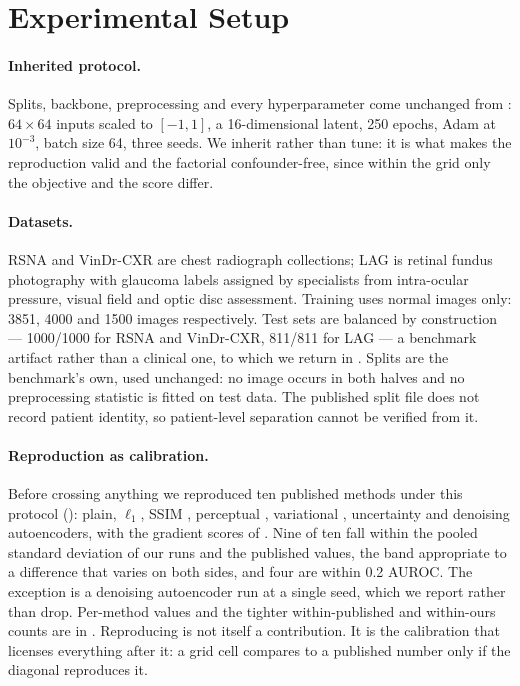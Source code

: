 \documentclass[pmlr,twocolumn,10pt]{jmlr} %
\begin{document}
\section{Experimental Setup}
\label{sec:setup}

\paragraph*{Inherited protocol.}
Splits, backbone, preprocessing and every hyperparameter come unchanged from
\citet{cai2025medianomaly}: $64\times64$ inputs scaled to $[-1,1]$, a 16-dimensional latent,
250 epochs, Adam at $10^{-3}$, batch size 64, three seeds. We inherit rather than tune: it is
what makes the reproduction valid and the factorial confounder-free, since within the grid
only the objective and the score differ.

\paragraph*{Datasets.}
RSNA \citep{shih2019rsna} and VinDr-CXR \citep{nguyen2022vindr} are chest radiograph
collections; LAG \citep{li2019lag} is retinal fundus photography with glaucoma labels
assigned by specialists from intra-ocular pressure, visual field and optic disc assessment.
Training uses normal images only: 3851, 4000 and 1500 images respectively. Test sets are
balanced by construction --- 1000/1000 for RSNA and VinDr-CXR, 811/811 for LAG --- a
benchmark artifact rather than a clinical one, to which we return in
. Splits are the benchmark's own, used unchanged: no image occurs in
both halves and no preprocessing statistic is fitted on test data. The published split file
does not record patient identity, so patient-level separation cannot be verified from it.

\paragraph*{Reproduction as calibration.}
Before crossing anything we reproduced ten published methods under this protocol
(): plain, $\ell_1$, SSIM \citep{bergmann2019improving}, perceptual
\citep{shvetsova2021anomaly}, variational \citep{kingma2014auto}, uncertainty
\citep{mao2020abnormality} and denoising \citep{kascenas2023role} autoencoders, with the
gradient scores of \citet{zimmerer2019unsupervised}. Nine of ten fall within the pooled standard deviation of our runs and the published
values, the band appropriate to a difference that varies on both sides, and four are within
0.2 AUROC. The exception is a denoising autoencoder run at a single seed, which we report
rather than drop. Per-method values and the tighter within-published and within-ours counts
are in . Reproducing is not itself a contribution. It is the calibration that licenses everything
after it: a grid cell compares to a published number only if the diagonal reproduces it.
\end{document}
